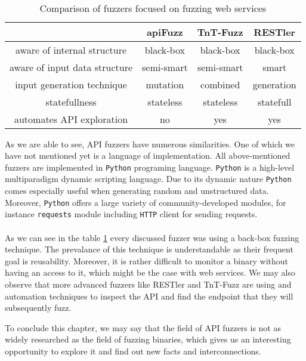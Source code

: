 \paragraph{}
\begin{table}[h]
\begin{center}
\begin{tabular}{|c|c c c|}
\hline
                              & apiFuzz    & TnT-Fuzz   & RESTler    \\
\hline
aware of internal structure   & black-box  & black-box  & black-box  \\
aware of input data structure & semi-smart & semi-smart & smart      \\
input generation technique    & mutation   & combined   & generation \\
statefullness                 & stateless  & stateless  & statefull  \\
automates API exploration     & no         & yes        & yes        \\
\hline
\end{tabular}
\caption{Comparison of fuzzers focused on fuzzing web services}
\label{table:fuzzers-comparison}
\end{center}
\end{table}

As we are able to see, API fuzzers have numerous similarities. One of which we have not mentioned yet is a language of implementation. All above-mentioned fuzzers are implemented in \texttt{Python} programing language. \texttt{Python} is a high-level multiparadigm dynamic scripting language. Due to its dynamic nature \texttt{Python} comes especially useful when generating random and unstructured data. Moreover, \texttt{Python} offers a large variety of community-developed modules, for instance \texttt{requests} module including \texttt{HTTP} client for sending requests.

\paragraph{}
As we can see in the table \ref{table:fuzzers-comparison} every discussed fuzzer was using a back-box fuzzing technique. The prevalance of this technique is understandable as their frequent goal is reusability. Moreover, it is rather difficult to monitor a binary without having an access to it, which might be the case with web services. We may also observe that more advanced fuzzers like RESTler and TnT-Fuzz are using and automation techniques to inspect the API and find the endpoint that they will subsequently fuzz.

To conclude this chapter, we may say that the field of API fuzzers is not as widely researched as the field of fuzzing binaries, which gives us an interesting opportunity to explore it and find out new facts and interconnections.

